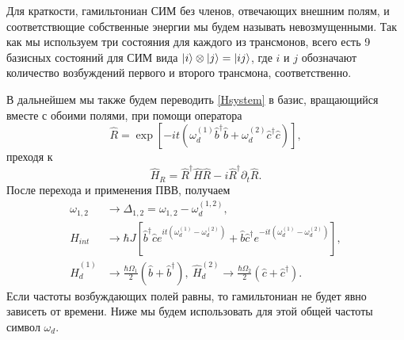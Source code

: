 \documentclass[14pt, a4paper]{extreport}
\DeclarePairedDelimiter\ket{\lvert}{\rangle}
\numberwithin{equation}{section}
\begin{document}
Для краткости, гамильтониан СИМ без членов, отвечающих внешним полям, и соответствющие собственные энергии мы будем называть невозмущенными. Так как мы используем три состояния для каждого из трансмонов, всего есть 9 базисных состояний для СИМ вида $\ket{i} \otimes \ket{j} = \ket{ij}$, где $i$ и $j$ обозначают количество возбуждений первого и второго трансмона, соответственно.

В дальнейшем мы также будем переводить \eqref{Hsystem} в базис, вращающийся вместе с обоими полями, при помощи оператора
\begin{equation}
	\hat R = \exp[-i t (\omega_d^{(1)}
	\hat b^{\dagger}\hat b+\omega_d^{(2)} 
	\hat c^{\dagger}\hat c)],\label{eq:R}
\end{equation}
преходя к 
\begin{equation}
\hat H_R = \hat R^{\dagger}\hat H \hat R -	 
{i}\hat R^{\dagger}\partial_t \hat 
R.\label{eq:rotation}
\end{equation}
После перехода и применения ПВВ, получаем
\begin{equation}
\begin{aligned}
\omega_{1,2} &\rightarrow \Delta_{1,2} = \omega_{1,2} - \omega_d^{(1,2)},\\
\hat H_{int} &\rightarrow \hbar J \left[\hat 
b^\dag \hat c e^{it(\omega_d^{(1)} - \omega_d^{(2)})} 
+ \hat b \hat c^\dag e^{-it(\omega_d^{(1)} - 
	\omega_d^{(2)})}\right],\\
\hat H_{d}^{(1)} &\rightarrow \frac{\hbar \Omega_1}{2}(\hat b  + \hat b^\dag),\ 	\hat H_{d}^{(2)} \rightarrow \frac{\hbar \Omega_2}{2}(\hat c  + \hat c^\dag).
\end{aligned}
\label{eq:RWA}
\end{equation}
Если частоты возбуждающих полей равны, то гамильтониан не будет явно зависеть от времени. Ниже мы будем использовать для этой общей частоты символ $\omega_d$.
\end{document}

